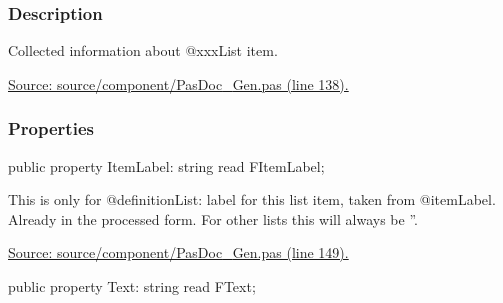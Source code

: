 \documentclass{report}
\newif\ifpdf
\begin{document}
\subsubsection*{\large{\textbf{Description}}\normalsize\hspace{1ex}\hfill}
Collected information about @xxxList item.\par
\href{https://github.com/pasdoc/pasdoc/blob/master/source/component/PasDoc_Gen.pas#L138}{Source: source/component/PasDoc{\_}Gen.pas (line 138).}\subsubsection*{\large{\textbf{Properties}}\normalsize\hspace{1ex}\hfill}
\begin{list}{}{
\setlength{\itemindent}{0cm}
\setlength{\listparindent}{0cm}
\setlength{\leftmargin}{\evensidemargin}
\addtolength{\leftmargin}{\tmplength}
\settowidth{\labelsep}{X}
\addtolength{\leftmargin}{\labelsep}
\setlength{\labelwidth}{\tmplength}
}
\label{PasDoc_Gen.TListItemData-ItemLabel}
\item[\textbf{ItemLabel}\hfill]
\ifpdf
\begin{flushleft}
\fi
\begin{ttfamily}
public property ItemLabel: string read FItemLabel;\end{ttfamily}

\ifpdf
\end{flushleft}
\fi


\par This is only for @definitionList: label for this list item, taken from @itemLabel. Already in the processed form. For other lists this will always be ''.\par
\href{https://github.com/pasdoc/pasdoc/blob/master/source/component/PasDoc_Gen.pas#L149}{Source: source/component/PasDoc{\_}Gen.pas (line 149).}\label{PasDoc_Gen.TListItemData-Text}
\item[\textbf{Text}\hfill]
\ifpdf
\begin{flushleft}
\fi
\begin{ttfamily}
public property Text: string read FText;\end{ttfamily}

\ifpdf
\end{flushleft}
\fi



\end{list}
\end{document}
